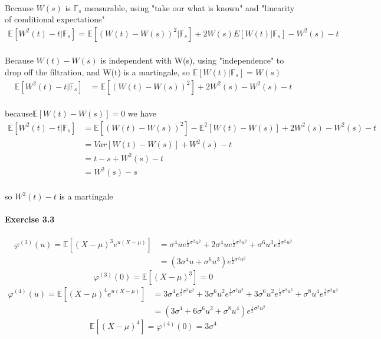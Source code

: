 \documentclass{article}
\begin{document}
\paragraph{}{Because $ W(s)$ is $\mathbb{F}_{s}$ measurable, using "take our what is known" and "linearity of conditional expectations"}
   \begin{align*}\mathbb{E}[W^{2}(t)-t|\mathbb{F}_{s}]=\mathbb{E}[(W(t)-W(s))^{2}|\mathbb{F}_{s}]+2W(s)E[W(t)|\mathbb{F}_{s}]-W^{2}(s)-t
  \end{align*}
\paragraph{}{Because $W(t)-W(s)$ is independent with W(s), using "independence" to drop off the filtration, and W(t) is a martingale, so $\mathbb{E}[W(t)|\mathbb{F}_{s}]=W(s)$}
\begin{align*}
\mathbb{E}[W^{2}(t)-t|\mathbb{F}_{s}]&
=\mathbb{E}[(W(t)-W(s))^{2}]+2W^{2}(s)-W^{2}(s)-t
  \end{align*}
\paragraph{}{because$\mathbb{E}[W(t)-W(s)]=0$ we have}
\begin{align*}
 \mathbb{E}[W^{2}(t)-t|\mathbb{F}_{s}]&=\mathbb{E}[(W(t)-W(s))^{2}]-\mathbb{E}^{2}[W(t)-W(s)]+2W^{2}(s)-W^{2}(s)-t\\
   &=Var[W(t)-W(s)]+W^{2}(s)-t\\
   &=t-s+W^{2}(s)-t\\
   &=W^{2}(s)-s
\end{align*}
\paragraph{}{so $W^{2}(t)-t$ is a martingale}
\paragraph{Exercise 3.3}{}
\begin{align*}
  \varphi^{(3)}(u)=\mathbb{E}[(X-\mu)^{3}e^{u(X-\mu)}]
  &
  =\sigma^{4}ue^{\frac{1}{2}\sigma^{2}u^{2}}
  +2\sigma^{4}ue^{\frac{1}{2}\sigma^{2}u^{2}}+\sigma^{6}u^{3}e^{\frac{1}{2}\sigma^{2}u^{2}}\\
   &
  =(3\sigma^{4}u+\sigma^{6}u^{3})e^{\frac{1}{2}\sigma^{2}u^{2}}
\end{align*}
\begin{displaymath}
   \varphi^{(3)}(0)=\mathbb{E}[(X-\mu)^{3}]=0
\end{displaymath}
\begin{align*}
  \varphi^{(4)}(u)=\mathbb{E}[(X-\mu)^{4}e^{u(X-\mu)}]
  &
  =3\sigma^{4}e^{\frac{1}{2}\sigma^{2}u^{2}}
  +3\sigma^{6}u^{2}e^{\frac{1}{2}\sigma^{2}u^{2}}+3\sigma^{6}u^{2}e^{\frac{1}{2}\sigma^{2}u^{2}}+\sigma^{8}u^{4}e^{\frac{1}{2}\sigma^{2}u^{2}}\\
   &
  =(3\sigma^{4}+6\sigma^{6}u^{2}+\sigma^{8}u^{4})e^{\frac{1}{2}\sigma^{2}u^{2}}
\end{align*}
\begin{displaymath}
   \mathbb{E}[(X-\mu)^{4}]=\varphi^{(4)}(0)=3\sigma^{4}
\end{displaymath}
\end{document}
